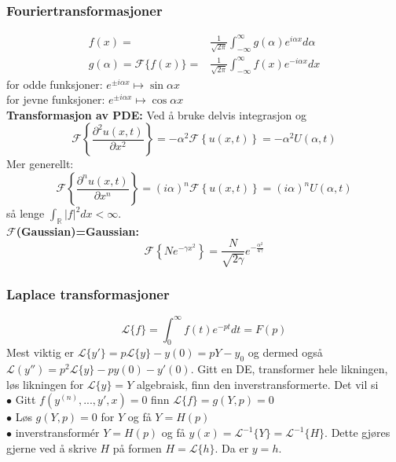 \documentclass[a4paper, norsk, 8pt]{article}
\newcommand{\EQU}[1] { \begin{equation*} \begin{split}
#1  
\end{split} \end{equation*} }
\newcommand{\PAR}[2]{ \frac{\partial #1}{\partial #2}}
\begin{document}
\begin{multicols*}{2}
\subsubsection*{\small Fouriertransformasjoner}
\EQU{
f(x)=& \frac{1}{\sqrt{2\pi}}\int_{-\infty}^{\infty}g(\alpha)e^{i\alpha x}d\alpha \\
g(\alpha)=\mathcal{F}\{f(x)\}=& \frac{1}{\sqrt{2\pi}}\int_{-\infty}^\infty f(x)e^{-i\alpha x}dx
}
for odde funksjoner: $e^{\pm i \alpha x}\mapsto \sin \alpha x$\\
for jevne funksjoner: $e^{\pm i \alpha x}\mapsto \cos \alpha x$ \\
\textbf{Transformasjon av PDE:} 
Ved å bruke delvis integrasjon og 
\[
\mathcal{F} \left\{ \PAR{^2u(x,t)}{x^2} \right\} = -\alpha^2 \mathcal{F} \left\{ u(x,t)\right\} =-\alpha^2U(\alpha,t)
\]
Mer generellt:
\[
\mathcal{F} \left\{ \PAR{^nu(x,t)}{x^n} \right\} = (i\alpha)^n \mathcal{F} \left\{ u(x,t)\right\} =(i\alpha)^n U(\alpha,t)
\]
så lenge $\int_{\mathbb{R}}|f|^2 dx < \infty$. \\
\textbf{$\mathcal{F}$(Gaussian)=Gaussian:}
\[
\mathcal{F}\left\{ Ne^{-\gamma x^2} \right\} = \frac{N}{\sqrt{2\gamma}}e^{-\frac{\alpha^2}{4\gamma}}
\]


\subsubsection*{\small Laplace transformasjoner}
\[
\mathcal{L}\{f\}=\int_0^\infty f(t)e^{-pt}dt=F(p)
\]
Mest viktig er $\mathcal{L}\{y'\}=p\mathcal{L}\{y\}-y(0)=pY-y_0$ og dermed også $\mathcal{L}(y'')=p^2\mathcal{L}\{y\}-py(0)-y'(0)$. Gitt en DE, transformer hele likningen, løs likningen for $\mathcal{L}\{y\}=Y$ algebraisk, finn den inverstransformerte. Det vil si \\
$\bullet$ Gitt $f(y^{(n)},...,y',x)=0$ finn $\mathcal{L}\{f\}=g(Y,p)=0$ \\
$\bullet$ Løs $g(Y,p)=0$ for $Y$ og få $Y=H(p)$ \\
$\bullet$ inverstransformér $Y=H(p)$ og få $y(x)=\mathcal{L}^{-1}\{Y\}=\mathcal{L}^{-1}\{H\}$. Dette gjøres gjerne ved å skrive $H$ på formen $H=\mathcal{L}\{h\}$. Da er $y=h$.


\end{multicols*}
\end{document}

